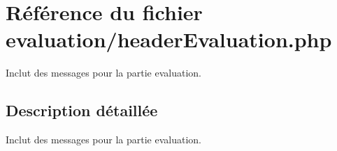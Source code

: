 \hypertarget{headerEvaluation_8php}{}\section{Référence du fichier evaluation/header\+Evaluation.php}
\label{headerEvaluation_8php}


Inclut des messages pour la partie evaluation.  




\subsection{Description détaillée}
Inclut des messages pour la partie evaluation. 

